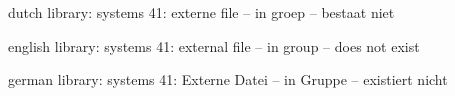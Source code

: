 

\unprotect

\startmessages  dutch  library: systems
     41: externe file -- in groep -- bestaat niet
\stopmessages

\startmessages  english  library: systems
     41: external file -- in group -- does not exist
\stopmessages

\startmessages  german  library: systems
     41: Externe Datei -- in Gruppe -- existiert nicht
\stopmessages


